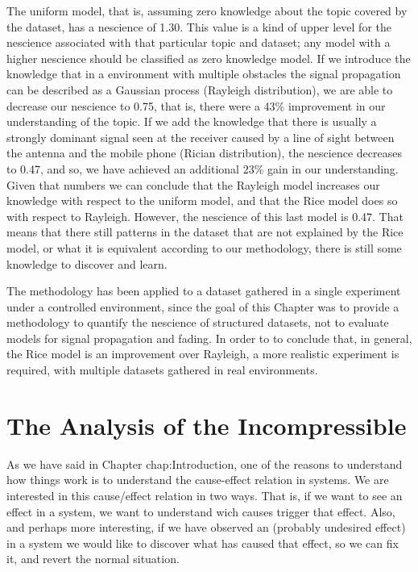 The uniform model, that is, assuming zero knowledge about the topic covered by the dataset, has a nescience of 1.30. This value is a kind of upper level for the nescience associated with that particular topic and dataset; any model with a higher nescience should be classified as zero knowledge model. If we introduce the knowledge that in a environment with multiple obstacles the signal propagation can be described as a Gaussian process (Rayleigh distribution), we are able to decrease our nescience to 0.75, that is, there were a 43\% improvement in our understanding of the topic. If we add the knowledge that there is usually a strongly dominant signal seen at the receiver caused by a line of sight between the antenna and the mobile phone (Rician distribution), the nescience decreases to 0.47, and so, we have achieved an additional 23\% gain in our understanding. Given that numbers we can conclude that the Rayleigh model increases our knowledge with respect to the uniform model, and that the Rice model does so with respect to Rayleigh. However, the nescience of this last model is 0.47. That means that there still patterns in the dataset that are not explained by the Rice model, or what it is equivalent according to our methodology, there is still some knowledge to discover and learn.

The methodology has been applied to a dataset gathered in a single experiment under a controlled environment, since the goal of this Chapter was to provide a methodology to quantify the nescience of structured datasets, not to evaluate models for signal propagation and fading. In order to to conclude that, in general, the Rice model is an improvement over Rayleigh, a more realistic experiment is required, with multiple datasets gathered in real environments.

%
%

\section{The Analysis of the Incompressible}

As we have said in Chapter {chap:Introduction}, one of the reasons to understand how things work is to understand the cause-effect relation in systems. We are interested in this cause/effect relation in two ways. That is, if we want to see an effect in a system, we want to understand wich causes trigger that effect. Also, and perhaps more interesting, if we have observed an (probably undesired effect) in a system we would like to discover what has caused that effect, so we can fix it, and revert the normal situation.

